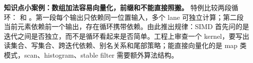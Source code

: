 \begin{casebox}
\textbf{知识点小案例：数组加法容易向量化，前缀和不能直接照搬。}
特例比较两段循环： 和 。第一段每个输出只依赖同一位置输入，多个 lane 可独立计算；第二段当前元素依赖前一个输出，存在循环携带依赖。由此推出规律：SIMD 首先问的是迭代之间是否独立，而不是循环看起来是否简单。工程上审查一个 kernel，要写出读集合、写集合、跨迭代依赖、别名关系和尾部策略；能直接向量化的是 map 类模式，scan、histogram、stable filter 需要额外算法结构。
\end{casebox}
